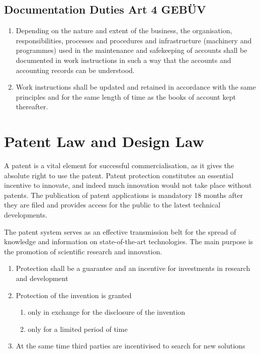 \documentclass[11pt]{article}
\theoremstyle{definition}
\begin{document}
\subsection{Documentation Duties Art 4 GEBÜV}
\begin{enumerate}[label=\arabic* ]
	\item Depending on the nature and extent of the business, the organisation, responsibilities, processes and procedures and infrastructure (machinery and programmes) used in the maintenance and safekeeping of accounts shall be documented in work instructions in such a way that the accounts and accounting records can be understood.
	\item Work instructions shall be updated and retained in accordance with the same principles and for the same length of time as the books of account kept thereafter.
\end{enumerate}

\section{Patent Law and Design Law}
A patent is a vital element for successful commercialisation, as it gives the absolute right to use the patent. Patent protection constitutes an essential incentive to innovate, and indeed much innovation would not take place without patents. The publication of patent applications is mandatory 18 months after they are filed and provides access for the public to the latest technical developments.

The patent system serves as an effective transmission belt for the spread of knowledge and information on state-of-the-art technologies. The main purpose is the promotion of scientific research and innovation.
\begin{enumerate}
	\item Protection shall be a guarantee and an incentive for investments in research and development
	\item Protection of the invention is granted
	\begin{enumerate}
		\item only in exchange for the disclosure of the invention
		\item only for a limited period of time
	\end{enumerate}
	\item At the same time third parties are incentivised to search for new solutions
\end{enumerate}
\end{document}
